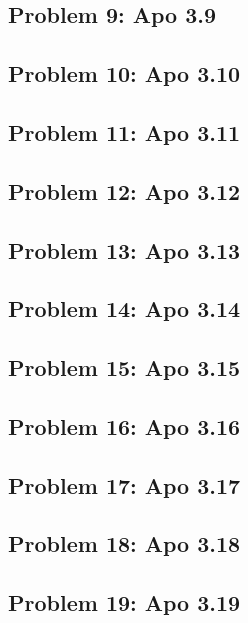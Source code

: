 \subsection[Problem 9]{Problem 9: Apo 3.9}

\subsection[Problem 10]{Problem 10: Apo 3.10}

\subsection[Problem 11]{Problem 11: Apo 3.11}

\subsection[Problem 12]{Problem 12: Apo 3.12}

\subsection[Problem 13]{Problem 13: Apo 3.13}

\subsection[Problem 14]{Problem 14: Apo 3.14}

\subsection[Problem 15]{Problem 15: Apo 3.15}

\subsection[Problem 16]{Problem 16: Apo 3.16}

\subsection[Problem 17]{Problem 17: Apo 3.17}

\subsection[Problem 18]{Problem 18: Apo 3.18}

\subsection[Problem 19]{Problem 19: Apo 3.19}

